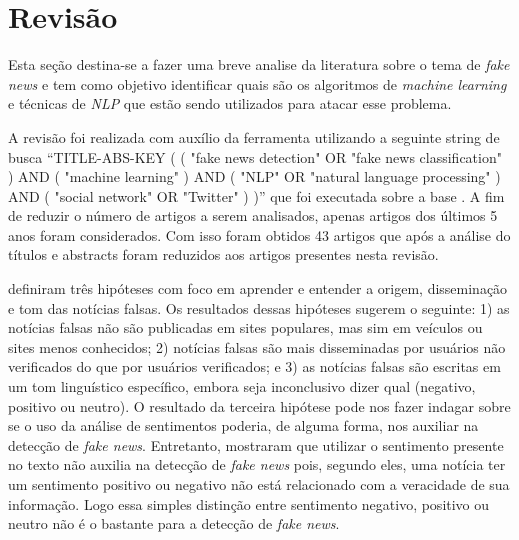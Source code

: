 \section{Revisão}



Esta seção destina-se a fazer uma breve analise da literatura sobre o tema de \textit{fake news} e tem como objetivo identificar quais são os algoritmos de \textit{machine learning} e técnicas de \textit{NLP} que estão sendo utilizados para atacar esse problema.


A revisão foi realizada com auxílio da ferramenta \cite{parsifal} utilizando a seguinte string de busca ``TITLE-ABS-KEY ( ( "fake news detection"  OR  "fake news classification" )  AND  ( "machine learning" )  AND  ( "NLP"  OR  "natural language processing" )  AND  ( "social network"  OR  "Twitter" ) )'' que foi executada sobre a base \cite{scopus}. A fim de reduzir o número de artigos a serem analisados, apenas artigos dos últimos 5 anos foram considerados. Com isso foram obtidos 43 artigos que após a análise do títulos e abstracts foram reduzidos aos artigos presentes nesta revisão.

\citet{parikh2019} definiram três hipóteses com foco em aprender e entender a origem, disseminação e tom das notícias falsas. Os resultados dessas hipóteses sugerem o seguinte: 1) as notícias falsas não são publicadas em sites populares, mas sim em veículos ou sites menos conhecidos; 2) notícias falsas são mais disseminadas por usuários não verificados do que por usuários verificados; e 3) as notícias falsas são escritas em um tom linguístico específico, embora seja inconclusivo dizer qual (negativo, positivo ou neutro). 
O resultado da terceira hipótese pode nos fazer indagar sobre se o uso da análise de sentimentos poderia, de alguma forma, nos auxiliar na detecção de \textit{fake news}. 
Entretanto,  \citet{baarir2020} mostraram que utilizar o sentimento presente no texto não auxilia na detecção de \textit{fake news} pois, segundo eles, uma notícia ter um sentimento positivo ou negativo não está relacionado com a veracidade de sua informação.
Logo essa simples distinção entre sentimento negativo, positivo ou neutro não é o bastante para a detecção de \textit{fake news}.


